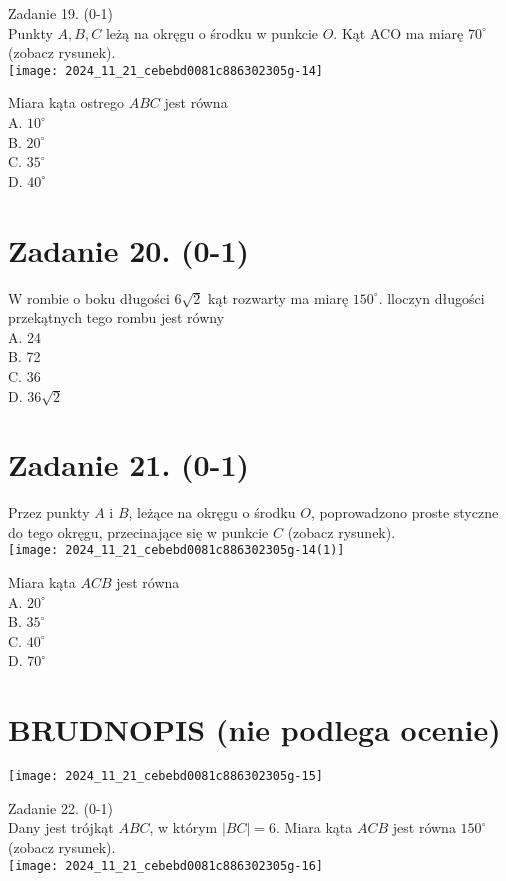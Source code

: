 \documentclass[10pt]{article}
\begin{document}
Zadanie 19. (0-1)\\
Punkty \(A, B, C\) leżą na okręgu o środku w punkcie \(O\). Kąt ACO ma miarę \(70^{\circ}\) (zobacz rysunek).\\
\texttt{[image: 2024\_11\_21\_cebebd0081c886302305g-14]}

Miara kąta ostrego \(A B C\) jest równa\\
A. \(10^{\circ}\)\\
B. \(20^{\circ}\)\\
C. \(35^{\circ}\)\\
D. \(40^{\circ}\)

\section*{Zadanie 20. (0-1)}
W rombie o boku długości \(6 \sqrt{2}\) kąt rozwarty ma miarę \(150^{\circ}\). lloczyn długości przekątnych tego rombu jest równy\\
A. 24\\
B. 72\\
C. 36\\
D. \(36 \sqrt{2}\)

\section*{Zadanie 21. (0-1)}
Przez punkty \(A\) i \(B\), leżące na okręgu o środku \(O\), poprowadzono proste styczne do tego okręgu, przecinające się w punkcie \(C\) (zobacz rysunek).\\
\texttt{[image: 2024\_11\_21\_cebebd0081c886302305g-14(1)]}

Miara kąta \(A C B\) jest równa\\
A. \(20^{\circ}\)\\
B. \(35^{\circ}\)\\
C. \(40^{\circ}\)\\
D. \(70^{\circ}\)

\section*{BRUDNOPIS (nie podlega ocenie)}
\begin{center}
\texttt{[image: 2024\_11\_21\_cebebd0081c886302305g-15]}
\end{center}

Zadanie 22. (0-1)\\
Dany jest trójkąt \(A B C\), w którym \(|B C|=6\). Miara kąta \(A C B\) jest równa \(150^{\circ}\) (zobacz rysunek).\\
\texttt{[image: 2024\_11\_21\_cebebd0081c886302305g-16]}
\end{document}
